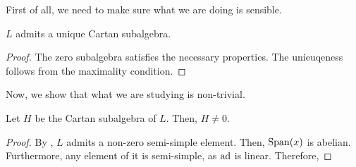 First of all, we need to make sure what we are doing is sensible.

\begin{lemma}
    $L$ admits a unique Cartan subalgebra.
\end{lemma}
\begin{proof}
    The zero subalgebra satisfies the necessary properties. The unieuqeness follows from the  maximality condition.
\end{proof}

Now, we show that what we are studying is non-trivial.

\begin{boxproposition}
    Let $H$ be the Cartan subalgebra of $L$. Then, $H \neq 0$.
\end{boxproposition}
\begin{proof}
    By , $L$ admits a non-zero semi-simple element. Then, $\operatorname{Span}\!\left( x \right)$ is abelian. Furthermore, any element of it is semi-simple, as $\operatorname{ad}$ is linear. Therefore, 
\end{proof}
